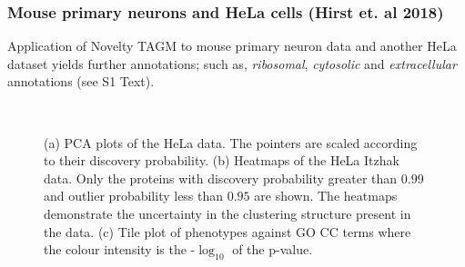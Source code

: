 \documentclass[12pt,english]{article}
\begin{document}
\subsubsection*{Mouse primary neurons and HeLa cells (Hirst et. al 2018)}
Application of Novelty TAGM to mouse primary neuron data \citep{Itzhak::2017} and another HeLa dataset \citep{Hirst:2018} yields further annotations; such as, \textit{ribosomal}, \textit{cytosolic} and \textit{extracellular} annotations (see S1 Text). 
\begin{figure}
	\begin{subfigure}[t]{0.5\textwidth}
		\centering
		\caption{}
	\end{subfigure}
	\begin{subfigure}[t]{0.5\textwidth}
		\centering
		\caption{}
	\end{subfigure}
~
	\begin{subfigure}[t]{\textwidth}
	\centering
	\caption{}
\end{subfigure}
	\caption{(a) PCA plots of the HeLa data. The pointers are scaled according to their discovery probability. (b) Heatmaps of the HeLa Itzhak data. Only the proteins with discovery probability greater than $0.99$ and outlier probability less than $0.95$ are shown. The heatmaps demonstrate the uncertainty in the clustering structure present in the data. (c) Tile plot of phenotypes against GO CC terms where the colour intensity is the -$\log_{10}$ of the p-value.}
	\label{figure:DOM}
\end{figure}
\clearpage
\end{document}
